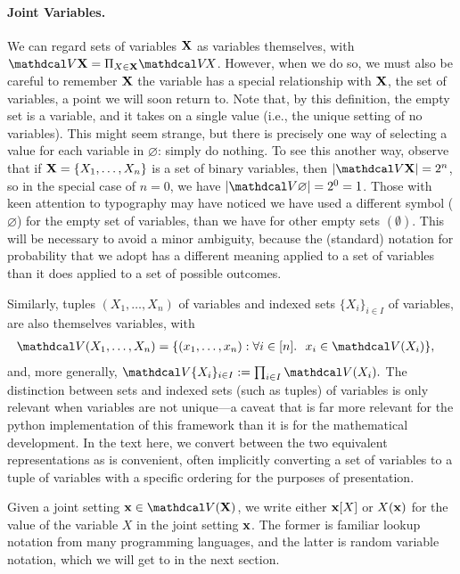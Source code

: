 \paragraph{Joint Variables.}
We can regard sets of variables $\mathbf X$ as variables themselves, with
$\V \mat X = \Pi_{X \in \mat X} \V\! X$.
However, when we do so, we must also be careful to remember $\mathbf X$ the variable has a special relationship with $\mathbf X$, the set of variables, a point we will soon return to. 
Note that, by this definition, the empty set is a variable, and it takes on a single value (i.e., the unique setting of no variables).  
This might seem strange, but there is precisely one way of selecting a value for each variable in $\varnothing$: simply do nothing. 
To see this another way, observe that if $\mathbf X = \{ X_1, \ldots, X_n \}$ is a set of binary variables,
then $|\V\mat X| = 2^n$, so in the special case of $n=0$, we have $|\V \varnothing | = 2^0 = 1$. 
Those with keen attention to typography may have noticed we have used a different symbol ($\varnothing$) for the empty set of variables, than we have for other empty sets $(\emptyset)$. 
This will be necessary to avoid a minor ambiguity, because the (standard) notation for probability that we adopt has a different meaning applied to a set of variables than it does applied to a set of possible outcomes. 

Similarly, tuples $(X_1, \ldots, X_n)$ of variables and indexed sets $\{X_i\}_{i \in I}$ of variables, are also themselves variables,
with
\begin{align*}
    \V(X_1, \ldots, X_n) &= \{ (x_1, \ldots, x_n) : \forall i \in [n].~~ x_i \in \V(X_i) \},
\end{align*}
and, more generally,
$
    \V\{ X_i \}_{i \in I} := \prod_{i \in I} \V(X_i).
$
The distinction between sets and indexed sets (such as tuples) of variables is only relevant when variables are not unique---a caveat that is far more relevant for the python implementation of this framework than it is for the mathematical development.
In the text here, we convert between the two equivalent representations as is convenient, often implicitly converting a set of variables to a tuple of variables with a specific ordering for the purposes of presentation.

Given a joint setting $\mat x \in \V(\mat X)$, we write either $\mathbf x[X]$ or  $X(\mathbf x)$ for the value of the variable $X$ in the joint setting $\mathbf x$. The former is familiar lookup notation from many programming languages, and the latter is random variable notation, which we will get to in the next section.

